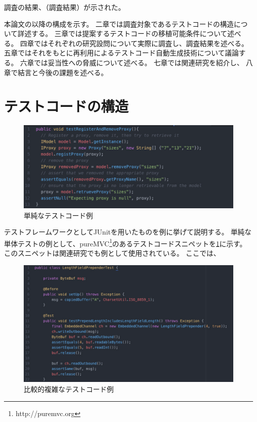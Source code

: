 \documentclass[conference]{IEEEtran}
\begin{document}
調査の結果、（調査結果）が示された。

本論文の以降の構成を示す。
二章では調査対象であるテストコードの構造について詳述する。
三章では提案するテストコードの移植可能条件について述べる。
四章ではそれぞれの研究設問について実際に調査し、調査結果を述べる。
五章ではそれをもとに再利用によるテストコード自動生成技術について議論する。
六章では妥当性への脅威について述べる。
七章では関連研究を紹介し、
八章で結言と今後の課題を述べる。

\section{テストコードの構造}

\begin{figure}[tb]
\begin{center}
\includegraphics[width=14cm]{img/snipetA.pdf}
\caption{単純なテストコード例}
\label{snipetA}
\end{center}
\end{figure}

テストフレームワークとしてJUnitを用いたものを例に挙げて説明する。
単純な単体テストの例として、pureMVC\footnote{http://puremvc.org}のあるテストコードスニペットを\ref{snipetA}に示す。
このスニペットは関連研究\cite{Ghafari2017}でも例として使用されている。
ここでは、



\begin{figure}[tb]
\begin{center}
\includegraphics[width=14cm]{img/snipetB.pdf}
\caption{比較的複雑なテストコード例}
\label{snipetB}
\end{center}
\end{figure}
\end{document}
